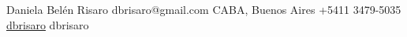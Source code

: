 \documentclass[pastel]{hipstercv}
\newlength{\rightcolwidth}
\begin{document}
\begin{paracol}{2}
\footnotesize

\vfill{} %

\setlength{\parindent}{0pt}
\begin{minipage}[t]{\rightcolwidth}
\begin{center}\fontfamily{\sfdefault}\selectfont \color{black!70}
{\small Daniela Bel\'en Risaro  dbrisaro@gmail.com  CABA, Buenos Aires \newline{}+5411 3479-5035  \protect\url{dbrisaro} dbrisaro
}
\end{center}
\end{minipage}


\end{paracol}
\end{document}
